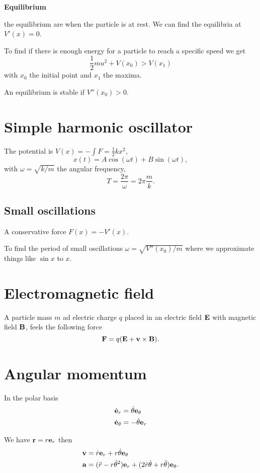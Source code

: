 \documentclass[10pt, a4paper]{article}
\begin{document}
\textbf{Equilibrium}

the equilibrium are when the particle is at rest.
We can find the equilibria at $V'(x) = 0$.

To find if there is enough energy for a particle to reach a specific speed we get
\[
\frac{1}{2}mu ^ 2 + V(x_0) > V(x_1)
\]
with $x_0$ the initial point and $x_1$ the maxima.

An equilibrium is stable if $V''(x_0) > 0$.

\newpage

\section{Simple harmonic oscillator}
The potential is $V(x) = -\int F = \frac{1}{2}kx ^ 2$,
\[
x(t) = A\cos(\omega t) + B\sin(\omega t),
\]
with $\omega = \sqrt{k / m}$ the angular frequency,
\[
T = \frac{2\pi}{\omega} = 2\pi\frac{m}{k}.
\]

\subsection{Small oscillations}
A conservative force $F(x) = -V'(x)$.

To find the period of small oscillations $\omega = \sqrt{V''(x_0) / m}$ where we approximate things like $\sin{x}$ to $x$.

\newpage

\section{Electromagnetic field}
A particle mass $m$ ad electric charge $q$ placed in an electric field $\mathbf{E}$ with magnetic field $\mathbf{B}$,
feels the following force
\[
\mathbf{F} = q(\mathbf{E} + \mathbf{v} \times \mathbf{B}).
\]

\newpage

\section{Angular momentum}

In the polar basis
\begin{align*}
    \dot{\mathbf{e}}_r &= \dot{\theta}\mathbf{e}_{\theta} \\
    \dot{\mathbf{e}}_\theta &= -\dot{\theta}\mathbf{e}_r
\end{align*}

We have $\mathbf{r} = r\mathbf{e}_r$ then
\begin{align*}
    \mathbf{v} &= \dot{r}\mathbf{e}_r + r\dot{\theta}\mathbf{e}_{\theta} \\
    \mathbf{a} &= (\ddot{r} - r\dot{\theta} ^ 2)\mathbf{e}_r + (2\dot{r}\dot{\theta} + r\ddot{\theta})\mathbf{e}_{\theta}.
\end{align*}
\end{document}
